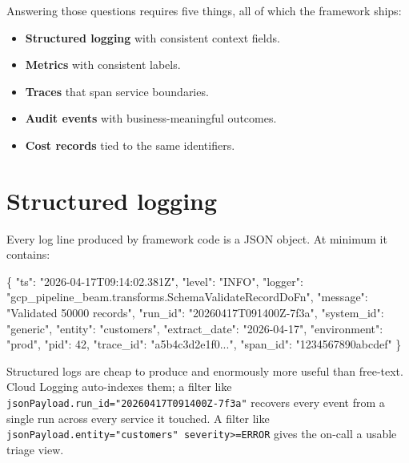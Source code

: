 \documentclass[
  11pt,
  british,
  oneside]{book}
\newenvironment{Shaded}{\begin{snugshade}}{\end{snugshade}}
\newcommand{\DataTypeTok}[1]{\textcolor[rgb]{0.13,0.29,0.53}{#1}}
\newcommand{\DecValTok}[1]{\textcolor[rgb]{0.00,0.00,0.81}{#1}}
\newcommand{\FunctionTok}[1]{\textcolor[rgb]{0.00,0.00,0.00}{#1}}
\newcommand{\StringTok}[1]{\textcolor[rgb]{0.31,0.60,0.02}{#1}}
\providecommand{\tightlist}{%
  \setlength{\itemsep}{0pt}\setlength{\parskip}{0pt}}
\begin{document}
Answering those questions requires five things, all of which the
framework ships:

\begin{itemize}
\tightlist
\item
  \textbf{Structured logging} with consistent context fields.
\item
  \textbf{Metrics} with consistent labels.
\item
  \textbf{Traces} that span service boundaries.
\item
  \textbf{Audit events} with business-meaningful outcomes.
\item
  \textbf{Cost records} tied to the same identifiers.
\end{itemize}

\hypertarget{structured-logging}{%
\section{Structured logging}\label{structured-logging}}

Every log line produced by framework code is a
JSON object. At minimum it contains:

\begin{Shaded}
\begin{Highlighting}[]
\FunctionTok{\{}
  \DataTypeTok{"ts"}\FunctionTok{:} \StringTok{"2026{-}04{-}17T09:14:02.381Z"}\FunctionTok{,}
  \DataTypeTok{"level"}\FunctionTok{:} \StringTok{"INFO"}\FunctionTok{,}
  \DataTypeTok{"logger"}\FunctionTok{:} \StringTok{"gcp\_pipeline\_beam.transforms.SchemaValidateRecordDoFn"}\FunctionTok{,}
  \DataTypeTok{"message"}\FunctionTok{:} \StringTok{"Validated 50000 records"}\FunctionTok{,}
  \DataTypeTok{"run\_id"}\FunctionTok{:} \StringTok{"20260417T091400Z{-}7f3a"}\FunctionTok{,}
  \DataTypeTok{"system\_id"}\FunctionTok{:} \StringTok{"generic"}\FunctionTok{,}
  \DataTypeTok{"entity"}\FunctionTok{:} \StringTok{"customers"}\FunctionTok{,}
  \DataTypeTok{"extract\_date"}\FunctionTok{:} \StringTok{"2026{-}04{-}17"}\FunctionTok{,}
  \DataTypeTok{"environment"}\FunctionTok{:} \StringTok{"prod"}\FunctionTok{,}
  \DataTypeTok{"pid"}\FunctionTok{:} \DecValTok{42}\FunctionTok{,}
  \DataTypeTok{"trace\_id"}\FunctionTok{:} \StringTok{"a5b4c3d2e1f0..."}\FunctionTok{,}
  \DataTypeTok{"span\_id"}\FunctionTok{:} \StringTok{"1234567890abcdef"}
\FunctionTok{\}}
\end{Highlighting}
\end{Shaded}

Structured logs are cheap to produce and enormously more useful than
free-text. Cloud Logging auto-indexes them; a filter like
\texttt{jsonPayload.run\_id="20260417T091400Z-7f3a"} recovers every
event from a single run across every service it touched. A filter like
\texttt{jsonPayload.entity="customers"\ severity\textgreater{}=ERROR}
gives the on-call a usable triage view.
\end{document}
